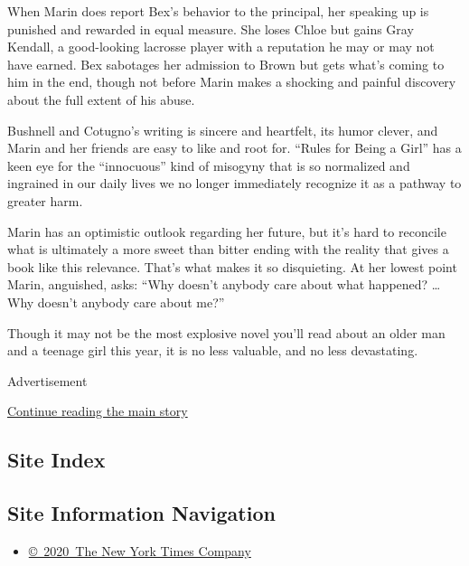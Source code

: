 When Marin does report Bex's behavior to the principal, her speaking up
is punished and rewarded in equal measure. She loses Chloe but gains
Gray Kendall, a good-looking lacrosse player with a reputation he may or
may not have earned. Bex sabotages her admission to Brown but gets
what's coming to him in the end, though not before Marin makes a
shocking and painful discovery about the full extent of his abuse.

Bushnell and Cotugno's writing is sincere and heartfelt, its humor
clever, and Marin and her friends are easy to like and root for. ``Rules
for Being a Girl'' has a keen eye for the ``innocuous'' kind of misogyny
that is so normalized and ingrained in our daily lives we no longer
immediately recognize it as a pathway to greater harm.

Marin has an optimistic outlook regarding her future, but it's hard to
reconcile what is ultimately a more sweet than bitter ending with the
reality that gives a book like this relevance. That's what makes it so
disquieting. At her lowest point Marin, anguished, asks: ``Why doesn't
anybody care about what happened? \ldots{} Why doesn't anybody care
about me?''

Though it may not be the most explosive novel you'll read about an older
man and a teenage girl this year, it is no less valuable, and no less
devastating.

Advertisement

\protect\hyperlink{after-bottom}{Continue reading the main story}

\hypertarget{site-index}{%
\subsection{Site Index}\label{site-index}}

\hypertarget{site-information-navigation}{%
\subsection{Site Information
Navigation}\label{site-information-navigation}}

\begin{itemize}
\tightlist
\item
  \href{https://help.nytimes3xbfgragh.onion/hc/en-us/articles/115014792127-Copyright-notice}{©~2020~The
  New York Times Company}
\end{itemize}

